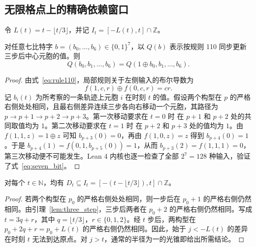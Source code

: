 \subsection{无限格点上的精确依赖窗口}

令 $L(t) = t - \lfloor t/3 \rfloor$，并记 $I_t = [-L(t), t] \cap \mathbb{Z}$。

\begin{lemma}[向右传播的三步界]\label{lem:three_step}
对任意七比特字 $b = (b_0, \dots, b_6) \in \{0, 1\}^7$，以 $Q(b)$ 表示按规则 110 同步更新三步后中心元胞的值。则
\begin{equation}\label{eq:seven_bit}
Q(b_0, b_1, \dots, b_6) = Q(1 \oplus b_0, b_1, \dots, b_6).
\end{equation}
\end{lemma}

\begin{proof}
由式~\eqref{eq:rule110}，局部规则关于左侧输入的布尔导数为
\begin{equation}\label{eq:bool_deriv}
f(1, c, r) \oplus f(0, c, r) = cr.
\end{equation}
记 $b_i(t)$ 为所考察的一条轨迹上元胞 $i$ 在时刻 $t$ 的值。假设两个构型在 $p$ 的严格右侧处处相同，且最右侧差异连续三步各向右移动一个元胞，其路径为 $p \to p+1 \to p+2 \to p+3$。第一次移动要求在 $t=0$ 时 在 $p+1$ 和 $p+2$ 处的共同取值均为 $1$。第二次移动要求在 $t=1$ 时 在 $p+2$ 和 $p+3$ 处的值均为 $1$。由 $f(1, 1, z) = 1 \oplus z$ 可知 $b_{p+3}(0) = 0$，再由 $f(1, 0, z) = z$ 得到 $b_{p+4}(0) = 1$。于是 $b_{p+4}(1) = f(0, 1, b_{p+5}(0)) = 1$，从而 $b_{p+3}(2) = f(1, 1, 1) = 0$，第三次移动便不可能发生。Lean 4 内核也逐一检查了全部 $2^7 = 128$ 种输入，验证了式~\eqref{eq:seven_bit}。
\end{proof}

\begin{theorem}[依赖集的普适界]\label{thm:upper_bound}
对每个 $t \in \mathbb{N}$，均有 $D_t \subseteq I_t = [-(t - \lfloor t/3 \rfloor), t] \cap \mathbb{Z}$。
\end{theorem}

\begin{proof}
若两个构型在 $p_0$ 的严格右侧处处相同，则一步后在 $p_0 + 1$ 的严格右侧仍然相同。由引理~\ref{lem:three_step}，三步后两者在 $p_0 + 2$ 的严格右侧仍然相同。写成 $t = 3q + r$，其中 $q = \lfloor t/3 \rfloor$，$r \in \{0, 1, 2\}$。经 $t$ 步后，两构型在 $p_0 + 2q + r = p_0 + L(t)$ 的严格右侧仍然相同。因此，始于 $j < -L(t)$ 的差异在时刻 $t$ 无法到达原点。对 $j > t$，通常的半径为一的光锥即给出所需结论。
\end{proof}

